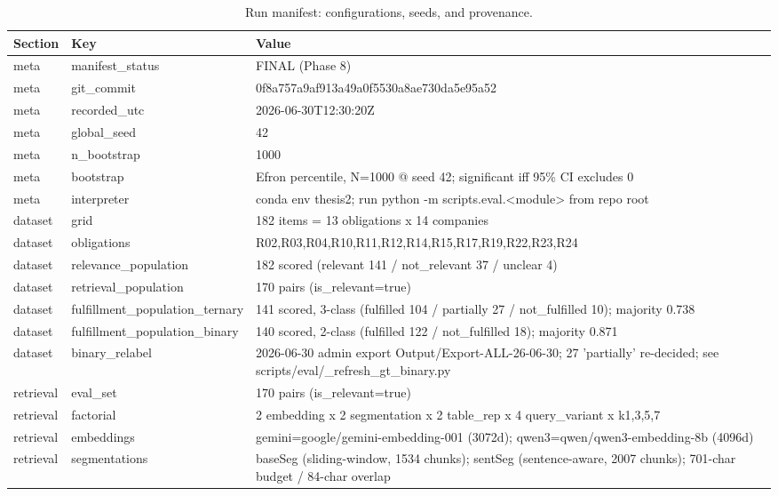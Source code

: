 \begin{table}[htbp]
  \centering
  \caption{Run manifest: configurations, seeds, and provenance.}
  \label{tab:run-manifest}
  \begin{tabular}{lll}
    \toprule
    Section & Key & Value \\
    \midrule
    meta & manifest\_status & FINAL (Phase 8) \\
    meta & git\_commit & 0f8a757a9af913a49a0f5530a8ae730da5e95a52 \\
    meta & recorded\_utc & 2026-06-30T12:30:20Z \\
    meta & global\_seed & 42 \\
    meta & n\_bootstrap & 1000 \\
    meta & bootstrap & Efron percentile, N=1000 @ seed 42; significant iff 95\% CI excludes 0 \\
    meta & interpreter & conda env thesis2; run python -m scripts.eval.<module> from repo root \\
    dataset & grid & 182 items = 13 obligations x 14 companies \\
    dataset & obligations & R02,R03,R04,R10,R11,R12,R14,R15,R17,R19,R22,R23,R24 \\
    dataset & relevance\_population & 182 scored (relevant 141 / not\_relevant 37 / unclear 4) \\
    dataset & retrieval\_population & 170 pairs (is\_relevant=true) \\
    dataset & fulfillment\_population\_ternary & 141 scored, 3-class (fulfilled 104 / partially 27 / not\_fulfilled 10); majority 0.738 \\
    dataset & fulfillment\_population\_binary & 140 scored, 2-class (fulfilled 122 / not\_fulfilled 18); majority 0.871 \\
    dataset & binary\_relabel & 2026-06-30 admin export Output/Export-ALL-26-06-30; 27 'partially' re-decided; see scripts/eval/\_refresh\_gt\_binary.py \\
    retrieval & eval\_set & 170 pairs (is\_relevant=true) \\
    retrieval & factorial & 2 embedding x 2 segmentation x 2 table\_rep x 4 query\_variant x k{1,3,5,7} \\
    retrieval & embeddings & gemini=google/gemini-embedding-001 (3072d); qwen3=qwen/qwen3-embedding-8b (4096d) \\
    retrieval & segmentations & baseSeg (sliding-window, 1534 chunks); sentSeg (sentence-aware, 2007 chunks); 701-char budget / 84-char overlap \\

\end{tabular}
\end{table}
